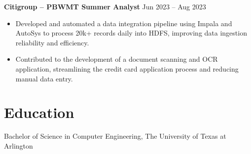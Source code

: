 \documentclass[11pt]{article}
\begin{document}
\textbf{Citigroup – PBWMT Summer Analyst} \hfill Jun 2023 -- Aug 2023
\begin{itemize}
    \item Developed and automated a data integration pipeline using Impala and AutoSys to process 20k+ records daily into HDFS, improving data ingestion reliability and efficiency.
    \item Contributed to the development of a document scanning and OCR application, streamlining the credit card application process and reducing manual data entry.
\end{itemize}

\vspace{3pt}

\section*{Education}
Bachelor of Science in Computer Engineering, The University of Texas at Arlington
\end{document}
